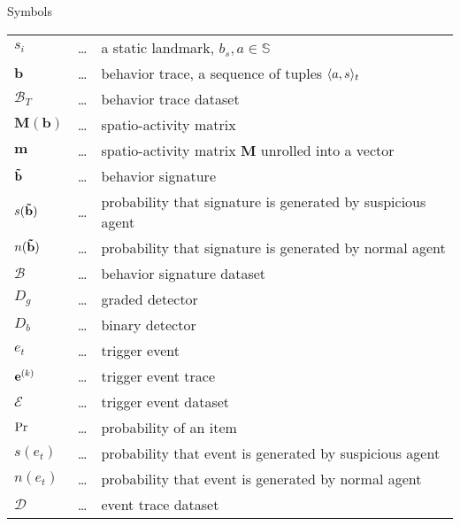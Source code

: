 \begin{preliminary}{Symbols}
\begin{supertabular}{lcl}
$s_i$						& \dots & a static landmark, $b_s, a\in\mathbb{S}$ \\


$\mathbf{b}$				& \dots & behavior trace, a sequence of tuples $\langle a,s \rangle_t$\\

$\mathcal{B}_T$				& \dots & behavior trace dataset\\

$\mathbf{M}(\mathbf{b})$	& \dots & spatio-activity matrix\\

 $\mathbf{m}$				& \dots & spatio-activity matrix $\mathbf{M}$ unrolled into a vector \\

$\mathbf{\tilde{b}}$						& \dots & behavior signature \\

$s(\mathbf{\tilde{b}})$					& \dots & probability that signature is generated by suspicious agent\\

$n(\mathbf{\tilde{b}})$					& \dots & probability that signature is generated by normal agent\\

$\mathcal{B}$				& \dots & behavior signature dataset\\

$D_g$						& \dots & graded detector\\
$D_b$						& \dots & binary detector\\

$e_t$						& \dots & trigger event\\
$\mathbf{e}^{\scriptsize(k)}$					& \dots & trigger event trace\\
$\mathcal{E}$					& \dots & trigger event dataset\\

$\text{Pr}$						& \dots & probability of an item\\

$s(e_t)$						& \dots & probability that event is generated by suspicious agent\\

$n(e_t)$						& \dots & probability that event is generated by normal agent\\

$\mathcal{D}$				& \dots & event trace dataset\\


\end{supertabular}
\end{preliminary}
